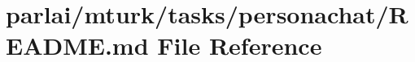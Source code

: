 \hypertarget{parlai_2mturk_2tasks_2personachat_2README_8md}{}\section{parlai/mturk/tasks/personachat/\+R\+E\+A\+D\+ME.md File Reference}
\label{parlai_2mturk_2tasks_2personachat_2README_8md}
